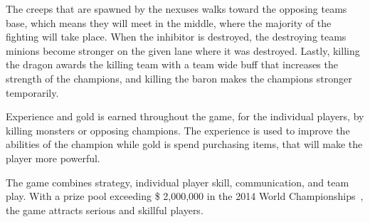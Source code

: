 The creeps that are spawned by the nexuses walks toward the opposing teams base, which means they will meet in the middle, where the majority of the fighting will take place. When the inhibitor is destroyed, the destroying teams minions become stronger on the given lane where it was destroyed. Lastly, killing the dragon awards the killing team with a team wide buff that increases the strength of the champions, and killing the baron makes the champions stronger temporarily.

Experience and gold is earned throughout the game, for the individual players, by killing monsters or opposing champions. The experience is used to improve the abilities of the champion while gold is spend purchasing items, that will make the player more powerful.

The game combines strategy, individual player skill, communication, and team play.
With a prize pool exceeding \$ 2,000,000 in the 2014 World Championships~\cite{lolprize}, the game attracts serious and skillful players.
